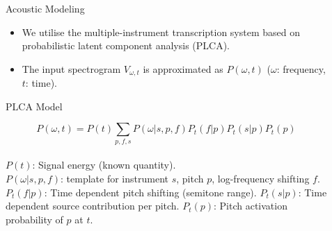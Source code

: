 \documentclass[final]{beamer}
\newlength{\sepwid}
\newlength{\onecolwid}
\newlength{\twocolwid}
\begin{document}
\begin{frame}[t]
\begin{columns}[t]
\begin{column}{\onecolwid}

\end{column} %

\begin{column}{\sepwid}\end{column} %

\begin{column}{\twocolwid} %

\begin{columns}[t,totalwidth=\twocolwid] %

\begin{column}{\onecolwid}\vspace{-.6in} %


\begin{block}{Acoustic Modeling}

\begin{itemize}
\item We utilise the multiple-instrument transcription system based on probabilistic latent component analysis (PLCA). 
\item The input spectrogram $V_{\omega,t}$ is approximated as $P(\omega,t)$ ($\omega$: frequency, $t$: time). 
\end{itemize}

\begin{alertblock}{PLCA Model}

\begin{equation}
P(\omega,t) = P(t)\sum_{p,f,s}P(\omega|s,p,f)P_{t}(f|p)P_{t}(s|p)P_{t}(p) \label{eq:Model} \nonumber
\end{equation} 
\\
$P(t)$: Signal energy (known quantity). \\
$P(\omega|s,p,f)$: template for instrument $s$, pitch $p$, log-frequency shifting $f$. \\
$P_{t}(f|p)$: Time dependent pitch shifting (semitone range). 
$P_{t}(s|p)$: Time dependent source contribution per pitch.
$P_{t}(p)$: Pitch activation probability of $p$ at $t$. 
\end{alertblock}


\end{block}
\end{column}
\end{columns}
\end{column}
\end{columns}
\end{frame}
\end{document}
